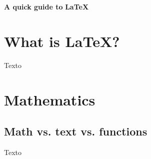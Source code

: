 \documentclass[guide]{zentera}
\begin{document}
\footnotesize

\begin{center}
  {\huge\sffamily\bfseries A quick guide to} \huge\bfseries \LaTeX \\
\end{center}


\begin{multicols}{3}

\section{What is {\rmfamily \LaTeX}?}

Texto

\section{Mathematics}

\subsection{Math vs. text vs. functions}

Texto

\end{multicols}

\end{document}
